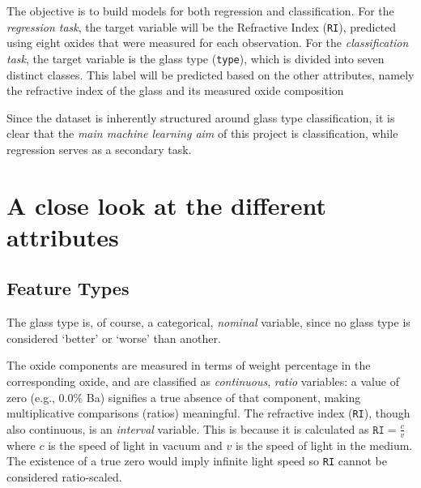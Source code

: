 \documentclass[dtu]{dtuarticle}
\newcommand{\todo}[1]{\color{red}[TODO: #1]\color{black}}
\begin{document}
%
%

	The objective is to build models for both regression and classification. For the \textit{regression task}, the target variable will be the Refractive Index (\texttt{RI}), predicted using eight oxides that were measured for each observation. For the \textit{classification task}, the target variable is the glass type (\texttt{type}), which is divided into seven distinct classes. This label will be predicted based on the other attributes, namely the refractive index of the glass and its measured oxide composition

	Since the dataset is inherently structured around glass type classification, it is clear that the \textit{main machine learning aim} of this project is classification, while regression serves as a secondary task.

	\section{A close look at the different attributes}


	\subsection{Feature Types}

	The glass type is, of course, a categorical, \textit{nominal} variable, since no glass type is considered `better' or `worse' than another.

	The oxide components are measured in terms of weight percentage in the corresponding oxide, and are classified as \textit{continuous}, \textit{ratio} variables: a value of zero (e.g., 0.0\% Ba) signifies a true absence of that component, making multiplicative comparisons (ratios) meaningful. The refractive index (\texttt{RI}), though also continuous, is an \textit{interval} variable. This is because it is calculated as \(\texttt{RI} = \frac{c}{v}\) where \(c\) is the speed of light in vacuum and \(v\) is the speed of light in the medium. The existence of a true zero would imply infinite light speed so \texttt{RI} cannot be considered ratio-scaled.
\end{document}
